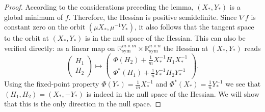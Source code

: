\documentclass[10pt,a4paper]{amsart}
\newcommand{\R}{\mathbb{R}}
\begin{document}
\begin{proof}
According to the considerations preceding the lemma, $(X_*,Y_*)$ is a global minimum of $f$. Therefore, the Hessian is positive semidefinite. Since $\nabla f$ is constant zero on the orbit $(\mu X_*, \mu^{-1} Y_*)$, it also follows that the tangent space to the orbit at $(X_*,Y_*)$ is in the null space of the Hessian. This can also be verified directly: as a linear map on $\R^{m \times m}_{\mathrm{sym}} \times \R^{n \times n}_{\mathrm{sym}}$ the Hessian at $(X_*,Y_*)$ reads
\[
\begin{pmatrix}
 H_1 \\ H_2
\end{pmatrix}
\mapsto
\begin{pmatrix}
 \Phi(H_2) + \frac{1}{m} X_*^{-1} H_1 X_*^{-1} \\ \Phi^*(H_1) + \frac{1}{n} Y_*^{-1} H_2 Y_*^{-1}
\end{pmatrix}.
\]
Using the fixed-point property $\Phi(Y_*) = \frac{1}{m} X_*^{-1}$ and $\Phi^*(X_*) = \frac{1}{n} Y_*^{-1}$ we see that $(H_1,H_2) = (X_*,-Y_*)$ is indeed in the null space of the Hessian. We will show that this is the only direction in the null space.


\end{proof}
\end{document}
